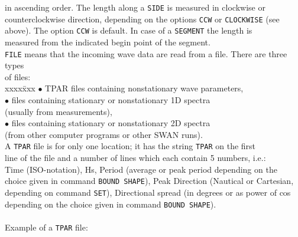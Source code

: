 \documentclass[12pt]{book}
\begin{document}
\begin{tabbing}
                        in ascending order. The length along a {\tt SIDE} is measured in clockwise or\\
                        counterclockwise direction, depending on the options {\tt CCW} or {\tt CLOCKWISE} (see\\
                        above). The option {\tt CCW} is default. In case of a {\tt SEGMENT} the length is\\
                        measured from the indicated begin point of the segment.\-\\
{\tt FILE}           \> means that the incoming wave data are read from a file. There are three types\+\\
                        of files:\\
                        \pushtabs
                        xxxx\=xxx \kill
                        {$\bullet$} \> TPAR files containing nonstationary wave parameters,\\
                        {$\bullet$} \> files containing stationary or nonstationary 1D spectra\+\\
                                       (usually from measurements),\-\\
                        {$\bullet$} \> files containing stationary or nonstationary 2D spectra\+\\
                                       (from other computer programs or other SWAN runs).\-\\
                        \poptabs
                        A {\tt TPAR} file is for only one location; it has the string {\tt TPAR} on the first\\
                        line of the file and a number of lines which each contain 5 numbers, i.e.:\\
                        Time (ISO-notation), Hs, Period (average or peak period depending on the\\
                        choice given in command {\tt BOUND SHAPE}), Peak Direction (Nautical or Cartesian,\\
                        depending on command {\tt SET}), Directional spread (in degrees or as power of cos\\
                        depending on the choice given in command {\tt BOUND SHAPE}).\\
                        \\
                        Example of a {\tt TPAR} file:\\
                        \pushtabs

\end{tabbing}
\end{document}
